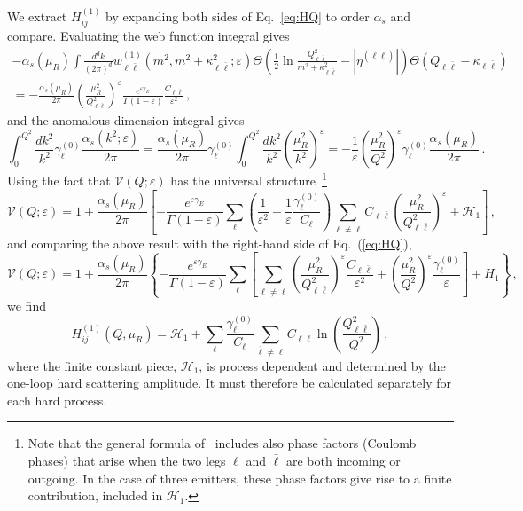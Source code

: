 We extract $H_{ij}^{(1)}$ by expanding both sides of
Eq.~\eqref{eq:HQ} to order $\alpha_s$ and compare.
Evaluating the web function integral gives
\begin{multline}
  \label{eq:w-exp}
  -\alpha_s(\mu_R)  \int \frac{d^dk}{(2\pi)^d} w^{(1)}_{\ell \bar \ell}(m^2,m^2+\kappa_{\ell\bar \ell}^2;\varepsilon) \Theta\left(\frac 12\ln\frac{Q^2_{\ell\bar \ell}}{m^2+\kappa_{\ell\bar \ell}^2}-|\eta^{(\ell\bar \ell)}| \right) \Theta(Q_{\ell \bar\ell}-\kappa_{\ell\bar \ell}) \\ = -\frac{\alpha_s(\mu_R)}{2\pi}
  \left(\frac{\mu_R^2}{Q^2_{\ell\bar \ell}}\right)^\varepsilon \frac{e^{\varepsilon\gamma_E}}{\Gamma(1-\varepsilon)} \frac{C_{\ell\bar \ell}}{\varepsilon^2}\,,
\end{multline}
and the anomalous dimension integral gives
\begin{equation}
  \label{eq:gamma0-int}
  \int_0^{Q^2}\!\!\frac{dk^2}{k^2}\gamma_\ell^{(0)}\frac{\alpha_s(k^2;\varepsilon)}{2\pi} = \frac{\alpha_s(\mu_R)}{2\pi}\gamma_\ell^{(0)} \int_0^{Q^2}\!\!\frac{dk^2}{k^2}\left(\frac{\mu_R^2}{k^2}\right)^{\varepsilon} = -\frac{1}{\varepsilon}\left(\frac{\mu_R^2}{Q^2}\right)^{\varepsilon} \gamma_\ell^{(0)}\frac{\alpha_s(\mu_R)}{2\pi}\,.
\end{equation}
Using the fact that $\mathcal{V}(Q;\varepsilon)$ has the universal structure~\cite{Catani:1998bh}\footnote{Note that the general formula of~\cite{Catani:1998bh} includes also phase factors (Coulomb phases) that arise when the two legs $\ell$ and $\bar \ell$ are both incoming or outgoing. In the case of three emitters, these phase factors give rise to a finite contribution, included in $\mathcal{H}_1$.}
\begin{equation}
  \label{eq:HQ-expanded}
  \mathcal{V}(Q;\varepsilon) = 1+\frac{\alpha_s(\mu_R)}{2\pi}\left[-\frac{e^{\varepsilon\gamma_E}}{\Gamma(1-\varepsilon)}\sum_\ell\left(\frac{1}{\varepsilon^2}+\frac{1}{\varepsilon}\frac{\gamma_\ell^{(0)}}{C_\ell}\right)\sum_{\bar \ell\ne \ell} C_{\ell\bar\ell}\left(\frac{\mu_R^2}{Q_{\ell\bar \ell}^2}\right)^{\varepsilon}+\mathcal{H}_1\right]\,,
\end{equation}
and comparing the above result with the right-hand side of Eq.~(\ref{eq:HQ}),
\begin{equation}
  \label{eq:HQ-rep-expanded}
  \mathcal{V}(Q;\varepsilon) = 1+\frac{\alpha_s(\mu_R)}{2\pi}\left\{-\frac{e^{\varepsilon\gamma_E}}{\Gamma(1-\varepsilon)}\sum_\ell\left[\sum_{\bar \ell\ne \ell}\left(\frac{\mu_R^2}{Q^2_{\ell\bar\ell}}\right)^{\varepsilon}\frac{C_{\ell\bar \ell}}{\varepsilon^2}+\left(\frac{\mu_R^2}{Q^2}\right)^{\varepsilon}\frac{\gamma_\ell^{(0)}}{\varepsilon}\right]+H_1\right\}\,,
\end{equation}
we find
\begin{equation}
  \label{eq:H1-final}
  H_{ij}^{(1)}(Q,\mu_R) = \mathcal{H}_1+ \sum_\ell\frac{\gamma_\ell^{(0)}}{C_\ell}\sum_{\bar \ell\ne \ell} C_{\ell\bar \ell}\ln\left(\frac{Q^2_{\ell\bar\ell}}{Q^2}\right)\,,
\end{equation}
where the finite constant piece, $\mathcal{H}_1$, is
process dependent and determined by the one-loop hard scattering
amplitude. It must therefore be calculated separately for each hard
process.

